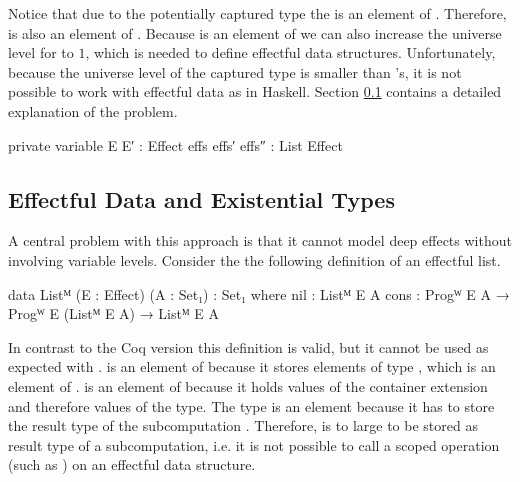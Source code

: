 Notice that due to the potentially captured type the  is an
element of .
Therefore,  is also an element of .
Because  is an element of  we can also
increase the universe level for  to $1$, which is needed to
define effectful data structures.
Unfortunately, because the universe level of the captured type is smaller than
's, it is not possible to work with effectful data as in
Haskell.
Section \ref{higher-order:eff-data-ext-types} contains a detailed explanation of
the problem.

\begin{code}[hide]
private
  variable
    E E′ : Effect
    effs effs′ effs″ : List Effect
\end{code}

\subsection{Effectful Data and Existential Types}
\label{higher-order:eff-data-ext-types}

A central problem with this approach is that it cannot model deep effects
without involving variable levels.
Consider the the following definition of an effectful list.

\begin{code}
data Listᴹ (E : Effect) (A : Set₁) : Set₁ where
  nil   : Listᴹ E A
  cons  : Progᵂ E A → Progᵂ E (Listᴹ E A) → Listᴹ E A
\end{code}
In contrast to the Coq version this definition is valid, but it cannot be used
as expected with .
\AgdaSpace{}\AgdaSpace{} is
an element of  because it stores elements of type
\AgdaSpace{}\AgdaSpace{},
which is an element of .
\AgdaSpace{}\AgdaSpace{} is
an element of  because it holds values of the container
extension and therefore values of the  type.
The  type is an element  because it has to
store the result type of the subcomputation .
Therefore,
\AgdaSpace{}\AgdaSpace{} is
to large to be stored as result type of a subcomputation, i.e. it is not possible
to call a scoped operation (such as ) on an effectful data
structure.

